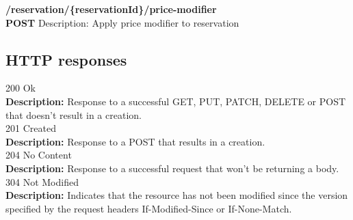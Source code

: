\documentclass[11pt,a4paper,pdftex]{article}
\begin{document}
\hspace*{1em}\textbf{/reservation/\{\textbf{reservationId}\}/price-modifier}\\
\hspace*{2em}\textbf{POST} Description: Apply price modifier to reservation\\




\subsection{HTTP responses}
\hspace*{1em}200 Ok\\
\hspace*{2em}\textbf{Description:} Response to a successful GET, PUT, PATCH, DELETE or POST that doesn't result in a creation.\\
\hspace*{1em}201 Created\\
\hspace*{2em}\textbf{Description:} Response to a POST that results in a creation.\\
\hspace*{1em}204 No Content\\
\hspace*{2em}\textbf{Description:} Response to a successful request that won't be returning a body.\\
\hspace*{1em}304 Not Modified\\
\hspace*{2em}\textbf{Description:} Indicates that the resource has not been modified since the version specified by the request headers If-Modified-Since or If-None-Match.
\end{document}

